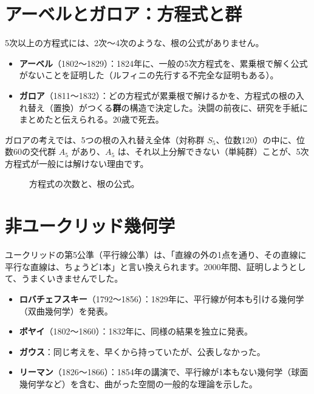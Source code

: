 \documentclass[a4paper,11pt,openany]{ltjsbook}
\begin{document}
\section{アーベルとガロア：方程式と群}

5次以上の方程式には、2次〜4次のような、根の公式がありません。

\begin{itemize}[leftmargin=*]
\item \textbf{アーベル}（1802〜1829）：1824年に、一般の5次方程式を、累乗根で解く公式がないことを証明した（ルフィニの先行する不完全な証明もある）。
\item \textbf{ガロア}（1811〜1832）：どの方程式が累乗根で解けるかを、方程式の根の入れ替え（置換）がつくる\textbf{群}の構造で決定した。決闘の前夜に、研究を手紙にまとめたと伝えられる。20歳で死去。
\end{itemize}

ガロアの考えでは、5つの根の入れ替え全体（対称群 $S_5$、位数120）の中に、位数60の交代群 $A_5$ があり、$A_5$ は、それ以上分解できない（単純群）ことが、5次方程式が一般には解けない理由です。

\begin{figure}[htbp]
\centering
{}
\caption{方程式の次数と、根の公式。}
\end{figure}

\section{非ユークリッド幾何学}

ユークリッドの第5公準（平行線公準）は、「直線の外の1点を通り、その直線に平行な直線は、ちょうど1本」と言い換えられます。2000年間、証明しようとして、うまくいきませんでした。

\begin{itemize}[leftmargin=*]
\item \textbf{ロバチェフスキー}（1792〜1856）：1829年に、平行線が何本も引ける幾何学（双曲幾何学）を発表。
\item \textbf{ボヤイ}（1802〜1860）：1832年に、同様の結果を独立に発表。
\item \textbf{ガウス}：同じ考えを、早くから持っていたが、公表しなかった。
\item \textbf{リーマン}（1826〜1866）：1854年の講演で、平行線が1本もない幾何学（球面幾何学など）を含む、曲がった空間の一般的な理論を示した。
\end{itemize}
\end{document}
